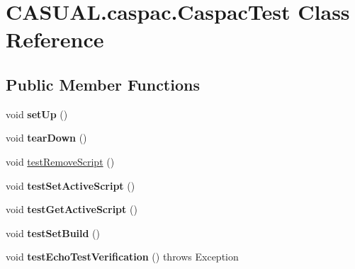 \hypertarget{classCASUAL_1_1caspac_1_1CaspacTest}{\section{C\-A\-S\-U\-A\-L.\-caspac.\-Caspac\-Test Class Reference}
\label{classCASUAL_1_1caspac_1_1CaspacTest}
}
\subsection*{Public Member Functions}
\begin{DoxyCompactItemize}
\item 
\hypertarget{classCASUAL_1_1caspac_1_1CaspacTest_a6b7a7de2245a1ada8fa98a3b01bfd381}{void {\bfseries set\-Up} ()}\label{classCASUAL_1_1caspac_1_1CaspacTest_a6b7a7de2245a1ada8fa98a3b01bfd381}

\item 
\hypertarget{classCASUAL_1_1caspac_1_1CaspacTest_a99c80cb032c5c3d1eab471503f4d448c}{void {\bfseries tear\-Down} ()}\label{classCASUAL_1_1caspac_1_1CaspacTest_a99c80cb032c5c3d1eab471503f4d448c}

\item 
void \hyperlink{classCASUAL_1_1caspac_1_1CaspacTest_aaf1801c0e6b7492e34fae5e25a83f23c}{test\-Remove\-Script} ()
\item 
\hypertarget{classCASUAL_1_1caspac_1_1CaspacTest_a056dc6cee1499f32fbc4dcde14c62557}{void {\bfseries test\-Set\-Active\-Script} ()}\label{classCASUAL_1_1caspac_1_1CaspacTest_a056dc6cee1499f32fbc4dcde14c62557}

\item 
\hypertarget{classCASUAL_1_1caspac_1_1CaspacTest_a4c2e5ad8b61d73f007534b58e1e80b54}{void {\bfseries test\-Get\-Active\-Script} ()}\label{classCASUAL_1_1caspac_1_1CaspacTest_a4c2e5ad8b61d73f007534b58e1e80b54}

\item 
\hypertarget{classCASUAL_1_1caspac_1_1CaspacTest_a7cbc2c75a5df1d2792affaa740f95e3f}{void {\bfseries test\-Set\-Build} ()}\label{classCASUAL_1_1caspac_1_1CaspacTest_a7cbc2c75a5df1d2792affaa740f95e3f}

\item 
\hypertarget{classCASUAL_1_1caspac_1_1CaspacTest_abe5ea7f10efe1f33733f9c43a8629864}{void {\bfseries test\-Echo\-Test\-Verification} ()  throws Exception }\label{classCASUAL_1_1caspac_1_1CaspacTest_abe5ea7f10efe1f33733f9c43a8629864}

\end{DoxyCompactItemize}
